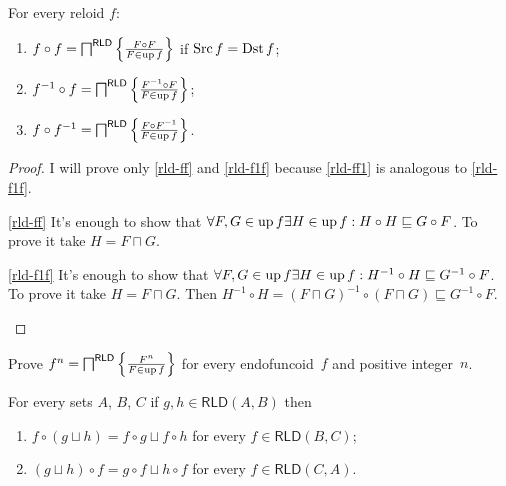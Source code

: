 \begin{thm}
\label{rld-prod-ff}For every reloid $f$:
\begin{enumerate}
\item \label{rld-ff}$f\circ f=\bigsqcap^{\mathsf{RLD}}\left\{ \frac{F\circ F}{F\in\operatorname{up} f}\right\}$
if $\operatorname{Src} f=\operatorname{Dst} f$;
\item \label{rld-f1f}$f^{-1}\circ f=\bigsqcap^{\mathsf{RLD}}\left\{ \frac{F^{-1}\circ F}{F\in\operatorname{up} f}\right\}$;
\item \label{rld-ff1}$f\circ f^{-1}=\bigsqcap^{\mathsf{RLD}}\left\{ \frac{F\circ F^{-1}}{F\in\operatorname{up} f}\right\}$.
\end{enumerate}
\end{thm}
\begin{proof}
I will prove only \ref{rld-ff} and \ref{rld-f1f} because \ref{rld-ff1}
is analogous to \ref{rld-f1f}.
\begin{widedisorder}
\item [{\ref{rld-ff}}] It's enough to show that $\forall F,G\in\operatorname{up} f\exists H\in\operatorname{up} f:H\circ H\sqsubseteq G\circ F$.
To prove it take $H=F\sqcap G$.
\item [{\ref{rld-f1f}}] It's enough to show that $\forall F,G\in\operatorname{up} f\exists H\in\operatorname{up} f:H^{-1}\circ H\sqsubseteq G^{-1}\circ F$.
To prove it take $H=F\sqcap G$. Then $H^{-1}\circ H=(F\sqcap G)^{-1}\circ(F\sqcap G)\sqsubseteq G^{-1}\circ F$.
\end{widedisorder}
\end{proof}
\begin{xca}\label{rld-fn}
Prove $f^n = \bigsqcap^{\mathsf{RLD}}\left\{ \frac{F^n}{F\in\operatorname{up} f}\right\}$ for every endofuncoid~$f$ and positive integer~$n$.
\end{xca}
\begin{thm}
For every sets $A$, $B$, $C$ if $g,h\in\mathsf{RLD}(A,B)$ then
\begin{enumerate}
\item $f\circ(g\sqcup h)=f\circ g\sqcup f\circ h$ for every $f\in\mathsf{RLD}(B,C)$;
\item $(g\sqcup h)\circ f=g\circ f\sqcup h\circ f$ for every $f\in\mathsf{RLD}(C,A)$.
\end{enumerate}
\end{thm}
